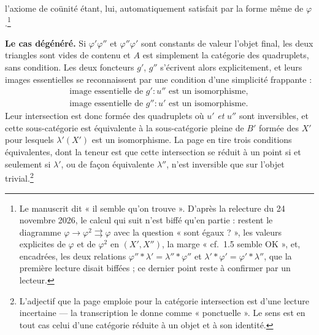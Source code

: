 \documentclass[11pt,a4paper]{article}
\begin{document}


l'axiome de coünité étant, lui, automatiquement satisfait par la forme même de
$\varphi$.\footnote{Le manuscrit dit « il semble qu'on trouve ». D'après la relecture
du 24 novembre 2026, le calcul qui suit n'est biffé qu'en partie : restent le
diagramme $\varphi \to \varphi^{2} \rightrightarrows \varphi$ avec la question
« sont égaux ? », les valeurs explicites de $\varphi$ et de $\varphi^{2}$ en
$(X', X'')$, la marge « cf.\ 1.5 semble OK », et, encadrées, les deux
relations $\varphi'' * \lambda' = \lambda'' * \varphi''$ et $\lambda' *
\varphi' = \varphi' * \lambda''$, que la première lecture disait biffées ;
ce dernier point reste à confirmer par un lecteur.}


\textbf{Le cas dégénéré.} Si $\varphi'\varphi''$ et $\varphi''\varphi'$ sont
constants de valeur l'objet final, les deux triangles sont vides de contenu et
$A$ est simplement la catégorie des quadruplets, sans condition. Les deux
foncteurs $g'$, $g''$ s'écrivent alors explicitement, et leurs images
essentielles se reconnaissent par une condition d'une simplicité frappante :
\begin{gather*}
  \text{image essentielle de } g' : u'' \text{ est un isomorphisme} , \\
  \text{image essentielle de } g'' : u' \text{ est un isomorphisme} .
\end{gather*}
Leur intersection est donc formée des quadruplets où $u'$ \emph{et} $u''$ sont
inversibles, et cette sous-catégorie est équivalente à la sous-catégorie pleine
de $B'$ formée des $X'$ pour lesquels $\lambda'(X')$ est un isomorphisme. La
page en tire trois conditions équivalentes, dont la teneur est que cette
intersection se réduit à un point si et seulement si $\lambda'$, ou de façon
équivalente $\lambda''$, n'est inversible que sur l'objet
trivial.\footnote{L'adjectif que la page emploie pour la catégorie
intersection est d'une lecture incertaine — la transcription le donne comme
« ponctuelle ». Le sens est en tout cas celui d'une catégorie réduite à un
objet et à son identité.}
\end{document}
